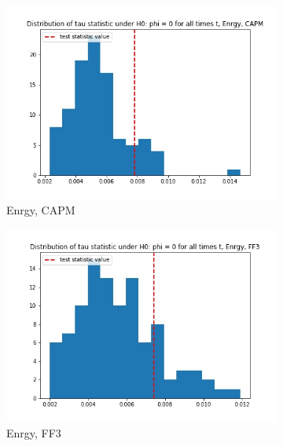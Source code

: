 \documentclass{article}
\begin{document}
  \begin{figure}
  \centering
  \begin{subfigure}[b]{0.3\textwidth}
    \centering
    \includegraphics[width=\textwidth]{Enrgy/tau_hist_02_CAPM.jpg}
    \caption{Enrgy, CAPM}
    \label{fig:1}
  \end{subfigure}
  \begin{subfigure}[b]{0.3\textwidth}
    \centering
    \includegraphics[width=\textwidth]{Enrgy/tau_hist_02_FF3.jpg}
    \caption{Enrgy, FF3}
    \label{fig:2}
  \end{subfigure}
    \begin{subfigure}[b]{0.3\textwidth}
    \centering

\end{subfigure}
\end{figure}
\end{document}
